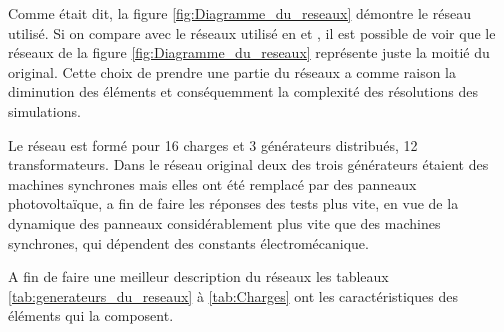 \newcommand{\trafoi}{40 MVA132/20}
\newcommand{\trafoii}{0.25MVA 20kV/0.4}
\newcommand{\trafoiii}{0.4MVA 20kV/0.4}
\newcommand{\trafoiv}{0.63MVA 20kV/0.4}
\newcommand{\cablei}{ARG7H1RX 185mmq}
\newcommand{\cableii}{ARG7H1RX 70mmq}
\newcommand{\cableiii}{Aerea Cu 70mmq}
Comme était dit, la figure \ref{fig:Diagramme_du_reseaux} démontre le réseau utilisé. Si on compare avec le réseaux utilisé en \cite{cosson:tel-01374469} et \cite{mariani2013controllo}, il est possible de voir que le réseaux de la figure  \ref{fig:Diagramme_du_reseaux} représente juste la moitié du original. Cette choix de prendre une partie du réseaux a comme raison la diminution des éléments et conséquemment la complexité des résolutions des simulations.

Le réseau est formé pour 16 charges et 3 générateurs distribués, 12 transformateurs.
Dans le réseau original deux des trois générateurs étaient des machines synchrones mais elles ont été remplacé par des panneaux photovoltaïque, a fin de faire les réponses des tests plus vite, en vue de la dynamique des panneaux considérablement plus vite que des machines synchrones, qui dépendent des constants électromécanique. 

A fin de faire une meilleur description du réseaux les tableaux \ref{tab:generateurs_du_reseaux} à \ref{tab:Charges} ont les caractéristiques des éléments qui la composent.

